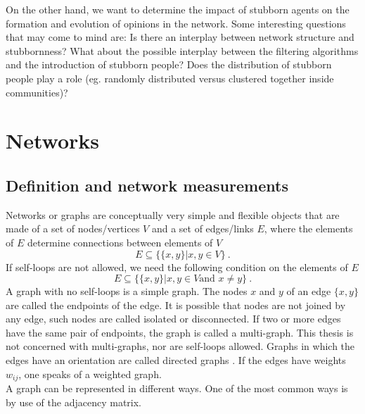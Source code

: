 \documentclass[11 pt , letterpaper , twoside , openright]{book}
\begin{document}
\newline
On the other hand, we want to determine the impact of stubborn agents on the formation and evolution of opinions in the network. Some interesting questions that may come to mind are: Is there an interplay between network structure and stubbornness? What about the possible interplay between the filtering algorithms and the introduction of stubborn people? Does the distribution of stubborn people play a role (eg. randomly distributed versus clustered together inside communities)? \\


\chapter{Networks}
\label{chap2}

\section{Definition and network measurements}
\label{netDef}

Networks or graphs are conceptually very simple and flexible objects that are made of a set of nodes/vertices $V$ and a set of edges/links $E$, where the elements of $E$ determine connections between elements of $V$ \cite{Costa2018}
\begin{equation}
	E \subseteq \{\{x, y\}| x, y \in V \}\ .
\end{equation}
If self-loops are not allowed, we need the following condition on the elements of $E$
\begin{equation}
	E \subseteq \{\{x, y\}| x, y \in V \text{and\ } x \neq y \} \ .
\end{equation}
A graph with no self-loops is a simple graph. The nodes $x$ and $y$ of an edge $\{x, y\}$ are called the endpoints of the edge. It is possible that nodes are not joined by any edge, such nodes are called isolated or disconnected. If two or more edges have the same pair of endpoints, the graph is called a multi-graph. This thesis is not concerned with multi-graphs, nor are self-loops allowed. Graphs in which the edges have an orientation are called directed graphs \cite{Costa2018}. If the edges have weights $w_{ij}$, one speaks of a weighted graph.\\
A graph can be represented in different ways. One of the most common ways is by use of the adjacency matrix.\\
\end{document}
